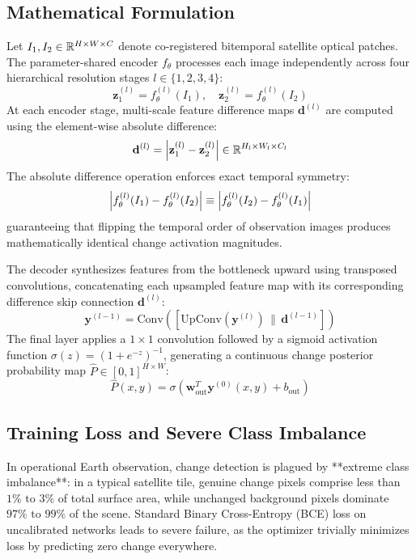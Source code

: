 \subsection{Mathematical Formulation}
Let $I_1, I_2 \in \mathbb{R}^{H \times W \times C}$ denote co-registered bitemporal satellite optical patches. The parameter-shared encoder $f_\theta$ processes each image independently across four hierarchical resolution stages $l \in \{1, 2, 3, 4\}$:
\begin{equation}
    \mathbf{z}_1^{(l)} = f_\theta^{(l)}(I_1), \quad \mathbf{z}_2^{(l)} = f_\theta^{(l)}(I_2)
    \label{eq:encoder_stages}
\end{equation}
At each encoder stage, multi-scale feature difference maps $\mathbf{d}^{(l)}$ are computed using the element-wise absolute difference:
\begin{equation}
    \mathbf{d}^{(l)} = \left\lvert\mathbf{z}_1^{(l)} - \mathbf{z}_2^{(l)}\right\rvert \in \mathbb{R}^{H_l \times W_l \times C_l}
    \label{eq:difference_skip}
\end{equation}
The absolute difference operation enforces exact temporal symmetry:
\begin{equation}
    \left\lvert f_\theta^{(l)}(I_1) - f_\theta^{(l)}(I_2)\right\rvert \equiv \left\lvert f_\theta^{(l)}(I_2) - f_\theta^{(l)}(I_1)\right\rvert
    \label{eq:temporal_symmetry}
\end{equation}
guaranteeing that flipping the temporal order of observation images produces mathematically identical change activation magnitudes.

The decoder synthesizes features from the bottleneck upward using transposed convolutions, concatenating each upsampled feature map with its corresponding difference skip connection $\mathbf{d}^{(l)}$:
\begin{equation}
    \mathbf{y}^{(l-1)} = \text{Conv}\left( \left[ \text{UpConv}(\mathbf{y}^{(l)}) \,\|\, \mathbf{d}^{(l-1)} \right] \right)
    \label{eq:decoder_upsample}
\end{equation}
The final layer applies a $1 \times 1$ convolution followed by a sigmoid activation function $\sigma(z) = (1 + e^{-z})^{-1}$, generating a continuous change posterior probability map $\hat{P} \in [0, 1]^{H \times W}$:
\begin{equation}
    \hat{P}(x, y) = \sigma\left( \mathbf{w}_{\text{out}}^T \mathbf{y}^{(0)}(x, y) + b_{\text{out}} \right)
    \label{eq:sigmoid_output}
\end{equation}

\subsection{Training Loss and Severe Class Imbalance}
In operational Earth observation, change detection is plagued by **extreme class imbalance**: in a typical satellite tile, genuine change pixels comprise less than $1\%\text{ to }3\%$ of total surface area, while unchanged background pixels dominate $97\%\text{ to }99\%$ of the scene. Standard Binary Cross-Entropy (BCE) loss on uncalibrated networks leads to severe failure, as the optimizer trivially minimizes loss by predicting zero change everywhere.

